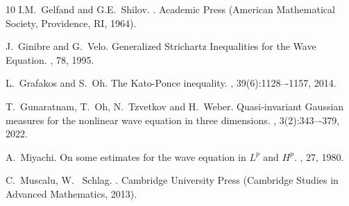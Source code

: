 \documentclass[a4paper, reqno, 11pt]{amsart}
\theoremstyle{definition}
\begin{document}
\begin{thebibliography}{10}
		I.M.~Gelfand and G.E.~Shilov.
		.
		\newblock Academic Press (American Mathematical Society, Providence, RI, 1964).
		

		J.~Ginibre and G.~Velo.
		\newblock Generalized Strichartz Inequalities for the Wave Equation.
		, 78, 1995.
		
		L.~Grafakos and S.~Oh.
		\newblock The Kato-Ponce inequality.
		, 39(6):1128–-1157, 2014.	
		
		
		
		T.~Gunaratnam, T.~Oh, N.~Tzvetkov and H.~Weber.
		\newblock Quasi-invariant Gaussian measures for the nonlinear wave equation in three dimensions.
		, 3(2):343–-379, 2022.
		
		A.~Miyachi.
		\newblock On some estimates for the wave equation in $L^p$ and $H^p$.
		, 27, 1980.		
		
		
	
	
		
		C.~Muscalu, W.~ Schlag.
		.
		\newblock  Cambridge University Press (Cambridge Studies in Advanced Mathematics, 2013).	
		


\end{thebibliography}
\end{document}
